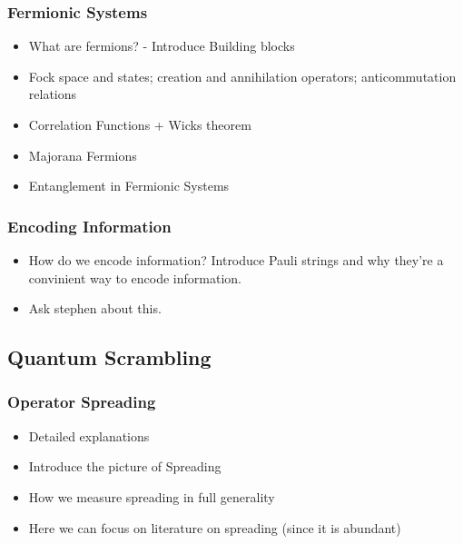 \documentclass[nofootinbib]{revtex4-2}
\begin{document}
        \subsubsection{Fermionic Systems}
        \begin{itemize}\color{ForestGreen}
            \item What are fermions? - Introduce Building blocks
            \item Fock space and states; creation and annihilation operators; anticommutation relations
            \item Correlation Functions + Wicks theorem
            \item Majorana Fermions 
            \item Entanglement in Fermionic Systems
        \end{itemize}
        \subsubsection{Encoding Information}
        \begin{itemize}\color{ForestGreen}
            \item How do we encode information? Introduce Pauli strings and why they're a convinient way to encode information. 
            \item Ask stephen about this. 
        \end{itemize}
        
    \subsection{Quantum Scrambling}
        \subsubsection{Operator Spreading}
        \begin{itemize}\color{ForestGreen}
            \item Detailed explanations
            \item Introduce the picture of Spreading
            \item How we measure spreading in full generality
            \item Here we can focus on literature on spreading (since it is abundant)
        \end{itemize}
\end{document}
